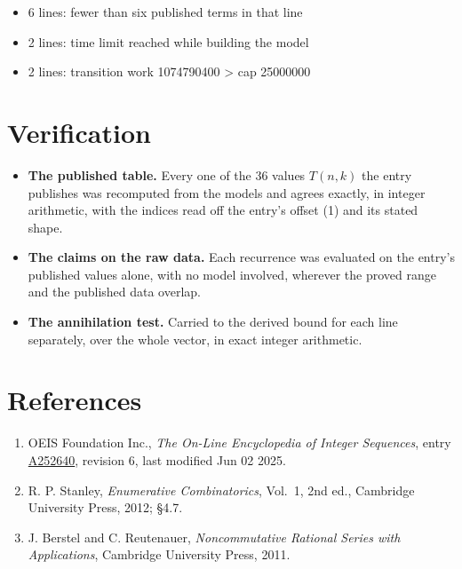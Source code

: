 \documentclass[11pt]{article}
\theoremstyle{definition}
\begin{document}
\begin{itemize}

\item 6 lines: fewer than six published terms in that line

\item 2 lines: time limit reached while building the model

\item 2 lines: transition work 1074790400 > cap 25000000

\end{itemize}

\section{Verification}

\begin{itemize}

\item {\bfseries The published table.} Every one of the 36 values $T(n,k)$ the entry publishes was recomputed from the models and agrees exactly, in integer arithmetic, with the indices read off the entry's offset (1) and its stated shape.

\item {\bfseries The claims on the raw data.} Each recurrence was evaluated on the entry's published values alone, with no model involved, wherever the proved range and the published data overlap.

\item {\bfseries The annihilation test.} Carried to the derived bound for each line separately, over the whole vector, in exact integer arithmetic.

\end{itemize}

\section{References}

\begin{enumerate}

\item OEIS Foundation Inc., \emph{The On-Line Encyclopedia of Integer Sequences}, entry \href{https://oeis.org/A252640}{A252640}, revision 6, last modified Jun 02 2025.

\item R. P. Stanley, \emph{Enumerative Combinatorics}, Vol.~1, 2nd ed., Cambridge University Press, 2012; \S4.7.

\item J. Berstel and C. Reutenauer, \emph{Noncommutative Rational Series with Applications}, Cambridge University Press, 2011.

\end{enumerate}
\end{document}
